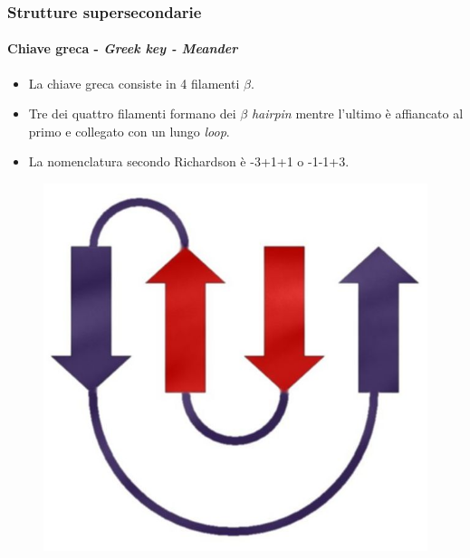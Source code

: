 \documentclass{beamer}
\begin{document}
\begin{frame}
\frametitle{Strutture supersecondarie}
  \framesubtitle{Chiave greca - \itshape{Greek key} - \itshape{Meander}}
\begin{itemize}
 \item La chiave greca consiste in 4 filamenti $\beta$.
 \item Tre dei quattro filamenti formano dei $\beta$ \emph{hairpin} mentre l'ultimo è affiancato al primo e collegato con un lungo \emph{loop}.
\pause  \item La nomenclatura secondo Richardson è -3+1+1 o -1-1+3.
\end{itemize}   \begin{figure}
\centering
\includegraphics[scale=0.7]{greek_key.jpg}\end{figure}
\end{frame}
\end{document}
